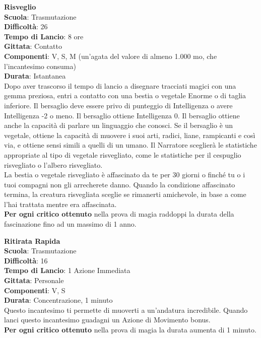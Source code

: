 \begin{multicols}{2}
\medskip\textbf{Risveglio}\\
\textbf{Scuola}: Trasmutazione\\
\textbf{Difficoltà}: 26\\
\textbf{Tempo di Lancio}: 8 ore\\
\textbf{Gittata}: Contatto\\
\textbf{Componenti}: V, S, M (un'agata del valore di almeno 1.000 mo, che l'incantesimo consuma)\\
\textbf{Durata}: Istantanea\\
Dopo aver trascorso il tempo di lancio a disegnare tracciati magici con una gemma preziosa, entri a contatto con una bestia o vegetale Enorme o di taglia inferiore. Il bersaglio deve essere privo di punteggio di Intelligenza o avere Intelligenza -2 o meno. Il bersaglio ottiene Intelligenza 0. Il bersaglio ottiene anche la capacità di parlare un linguaggio che conosci. Se il bersaglio è un vegetale, ottiene la capacità di muovere i suoi arti, radici, liane, rampicanti e così via, e ottiene sensi simili a quelli di un umano. Il Narratore sceglierà le statistiche appropriate al tipo di vegetale risvegliato, come le statistiche per il cespuglio risvegliato o l'albero risvegliato.\\
La bestia o vegetale risvegliato è affascinato da te per 30 giorni o finché tu o i tuoi compagni non gli arrecherete danno. Quando la condizione affascinato termina, la creatura risvegliata sceglie se rimanerti amichevole, in base a come l'hai trattata mentre era affascinata.\\
\textbf{Per ogni critico ottenuto} nella prova di magia raddoppi la durata della fascinazione fino ad un massimo di 1 anno.

\medskip\textbf{Ritirata Rapida}\\
\textbf{Scuola}: Trasmutazione\\
\textbf{Difficoltà}: 16\\
\textbf{Tempo di Lancio}: 1 Azione Immediata\\
\textbf{Gittata}: Personale\\
\textbf{Componenti}: V, S\\
\textbf{Durata}: Concentrazione, 1 minuto\\
Questo incantesimo ti permette di muoverti a un'andatura incredibile. Quando lanci questo incantesimo guadagni un Azione di Movimento bonus.\\
\textbf{Per ogni critico ottenuto} nella prova di magia la durata aumenta di 1 minuto.


\end{multicols}
